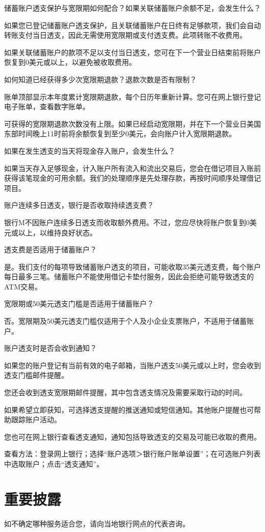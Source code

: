 \documentclass[UTF8,fontset=none,11pt,a4paper]{ctexart}
\begin{document}
储蓄账户透支保护与宽限期如何配合？如果关联储蓄账户余额不足，会发生什么？


如果您已登记储蓄账户透支保护，且关联储蓄账户在日终有足够款项，我们会自动转账支付当日透支，因此无需使用宽限期或支付透支费。此项转账不收费用。


如果关联储蓄账户的款项不足以支付当日透支，您可在下一个营业日结束前将账户恢复到0美元或以上，以避免被收取费用。


如何知道已经获得多少次宽限期退款？退款次数是否有限制？


账单顶部显示本年度累计宽限期退款，每个日历年重新计算。您可在网上银行登记电子账单，查看数字账单。


可获得的宽限期退款次数没有上限。如果已经启动宽限期，并在下一个营业日美国东部时间晚上11时前将余额恢复到至少0美元，会向账户计入宽限期退款。


如果在发生透支的当天将现金存入账户，会发生什么？


如果当天存入足够现金，计入账户所有流入和流出交易后，您会在借记项目入账前获得该笔现金的可用余额。我们的处理顺序是先处理存款，再按时间顺序处理借记项目。


账户连续多日透支，银行是否收取持续透支费？


银行M不因账户连续多日透支而收取额外费用。不过，您应尽快将账户恢复到0美元或以上，以维持良好状态。


透支费是否适用于储蓄账户？


是。我们支付的每项导致储蓄账户透支的项目，可能收取35美元透支费，每个账户每日最多三笔。储蓄账户不能使用借记卡垫付服务，因此会拒绝可能导致透支的ATM交易。


宽限期或50美元透支门槛是否适用于储蓄账户？


否。宽限期及50美元透支门槛仅适用于个人及小企业支票账户，不适用于储蓄账户。


账户透支时是否会收到通知？


如果您的账户登记有当前有效的电子邮箱，当账户透支50美元或以上时，您会收到透支门槛邮件提醒。


您还会收到透支宽限期邮件提醒，其中包含透支情况及需要采取行动的时间。


如果希望立即获知，可选择透支提醒的推送通知或短信通知。其他账户提醒也可帮助跟踪账户活动。


您也可在网上银行查看透支通知，通知包括导致透支的交易及可能已收取的费用。


查看方法：登录网上银行；选择“账户选项＞银行账户账单设置”；在可选账户列表中选取账户；点击“透支通知”。


\section*{重要披露}
如不确定哪种服务适合您，请向当地银行网点的代表咨询。
\end{document}
